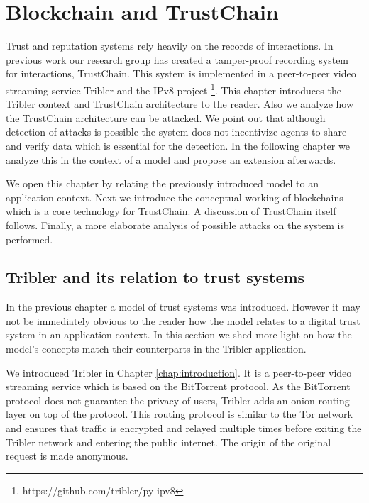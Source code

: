 \chapter{Blockchain and TrustChain}
\label{chap:implementation}

Trust and reputation systems rely heavily on the records of interactions. In previous work our 
research group has created a tamper-proof recording system for interactions, TrustChain. This system is 
implemented in a peer-to-peer video streaming service Tribler and the IPv8 project
\footnote{https://github.com/tribler/py-ipv8}. This chapter introduces the Tribler context and TrustChain 
architecture to the reader. Also we analyze how the TrustChain architecture can be attacked. We point
out that although detection of attacks is possible the system does not incentivize agents to share 
and verify data which is essential for the detection. In the following chapter we analyze this in the
context of a model and propose an extension afterwards. 


We open this chapter by relating the previously introduced model to an application context. Next we
introduce the conceptual working of blockchains which is a core technology for TrustChain. A discussion of
TrustChain itself follows. Finally, a more elaborate analysis of possible attacks on the system is performed.

\section{Tribler and its relation to trust systems}
In the previous chapter a model of trust systems was introduced. However it may not be immediately obvious 
to the reader how the model relates to a digital
trust system in an application context. In this section we shed more light on how the model's concepts 
match their counterparts in the Tribler application.

We introduced Tribler in Chapter \ref{chap:introduction}. It is a peer-to-peer video streaming 
service which is based on the BitTorrent protocol. As the BitTorrent protocol does not guarantee the
privacy of users, Tribler adds an onion routing layer on top of the protocol. This routing protocol 
is similar to the Tor network and ensures that traffic is encrypted and relayed multiple times before exiting the
Tribler network and entering the public internet. The origin of the original request is made anonymous.

